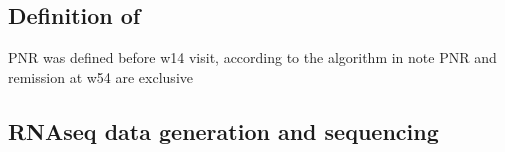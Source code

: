 \begin{outline}
\subsection{Definition of }

%
\1 \gls{PNR} was defined before w14 visit, according to the algorithm in \autocite{kennedy2019PredictorsAntiTNFTreatment}
    \2 note PNR and remission at w54 are exclusive

\subsection{RNAseq data generation and sequencing}


\end{outline}
